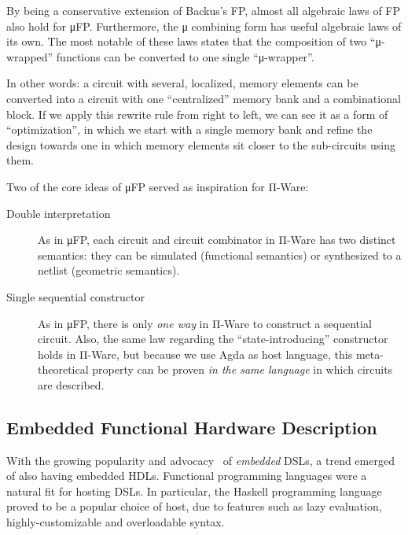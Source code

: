         By being a conservative extension of Backus's FP, almost all algebraic laws of FP also hold for μFP.
        Furthermore, the μ combining form has useful algebraic laws of its own.
        The most notable of these laws states that the composition of two ``μ-wrapped'' functions
        can be converted to one single ``μ-wrapper''.

        In other words: a circuit with several, localized, memory elements can be converted into a circuit
        with one ``centralized'' memory bank and a combinational block.
        If we apply this rewrite rule from right to left, we can see it as a form of ``optimization'',
        in which we start with a single memory bank and refine the design towards one in which
        memory elements sit closer to the sub-circuits using them.

        Two of the core ideas of μFP served as inspiration for Π-Ware:

        \begin{description}
            \item[Double interpretation] As in μFP,
                each circuit and circuit combinator in Π-Ware has two distinct semantics:
                they can be simulated (functional semantics) or synthesized to a netlist (geometric semantics).
            \item[Single sequential constructor] As in μFP,
                there is only \emph{one way} in Π-Ware to construct a sequential circuit.
                Also, the same law regarding the ``state-introducing'' constructor holds in Π-Ware,
                but because we use Agda as host language, this meta-theoretical property can be proven
                \emph{in the same language} in which circuits are described.
        \end{description}


        \subsection{Embedded Functional Hardware Description}
        \label{subsec:embedded-functional-hardware}
            With the growing popularity and advocacy~\cite{hudak-edsls} of \emph{embedded} \acp{DSL},
            a trend emerged of also having embedded \acp{HDL}.
            Functional programming languages were a natural fit for hosting \acp{DSL}.
            In particular, the Haskell programming language proved to be a popular choice of host,
            due to features such as lazy evaluation, highly-customizable and overloadable syntax.


